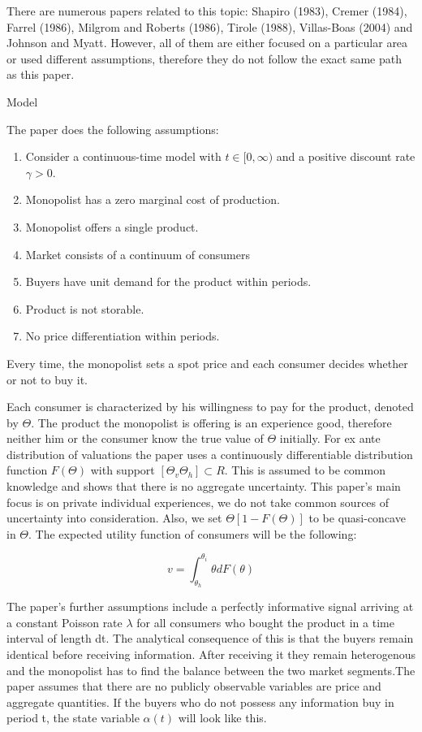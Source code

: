 \documentclass[12pt]{report}
\numberwithin{equation}{section}
\begin{document}
There are numerous papers related to this topic: Shapiro (1983), Cremer (1984), Farrel (1986), Milgrom and Roberts (1986), Tirole (1988), Villas-Boas (2004) and Johnson and Myatt. However, all of them are either focused on a particular area or used different assumptions, therefore they do not follow the exact same path as this paper.

Model

The paper does the following assumptions:

\begin{enumerate}
	\item Consider a continuous-time model with $t \in [0, \infty )$ and a positive discount rate $\gamma>0$.
	\item Monopolist has a zero marginal cost of production.
	\item Monopolist offers a single product.
	\item Market consists of a continuum of consumers
	\item Buyers have unit demand for the product within periods.
	\item Product is not storable.
	\item No price differentiation within periods.
\end{enumerate}

Every time, the monopolist sets a spot price and each consumer decides whether or not to buy it.

Each consumer is characterized by his willingness to pay for the product, denoted by $\Theta$. The product the monopolist is offering is an experience good, therefore neither him or the consumer know the true value of $\Theta$ initially. For ex ante distribution of valuations the paper uses a continuously differentiable distribution function $F(\Theta)$ with support $[\Theta_v\Theta_h] \subset R$. This is assumed to be common knowledge and shows that there is no aggregate uncertainty. This paper’s main focus is on private individual experiences, we do not take common sources of uncertainty into consideration. Also, we set $\Theta [1-F(\Theta)]$ to be quasi-concave in $\Theta$. The expected utility function of consumers will be the following:

\begin{equation}
v = \int_{\theta_h}^{\theta_i} \theta d F(\theta) 
\end{equation}

The paper’s further assumptions include a perfectly informative signal arriving at a constant Poisson rate $\lambda$ for all consumers who bought the product in a time interval of length dt. The analytical consequence of this is that the buyers remain identical before receiving information. After receiving it they remain heterogenous and the monopolist has to find the balance between the two market segments.The paper assumes that there are no publicly observable variables are price and aggregate quantities. If the buyers who do not possess any information buy in period t, the state variable $\alpha(t)$ will look like this.
\end{document}
